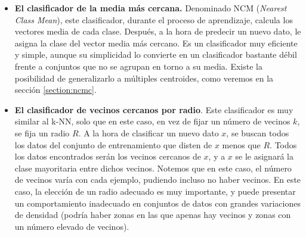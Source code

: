 \begin{itemize}
    \item \textbf{El clasificador de la media más cercana.} Denominado NCM (\emph{Nearest Class Mean}), este clasificador, durante el proceso de aprendizaje, calcula los vectores media de cada clase. Después, a la hora de predecir un nuevo dato, le asigna la clase del vector media más cercano. Es un clasificador muy eficiente y simple, aunque su simplicidad lo convierte en un clasificador bastante débil frente a conjuntos que no se agrupan en torno a su media. Existe la posibilidad de generalizarlo a múltiples centroides, como veremos en la sección \ref{section:ncmc}.

    \item \textbf{El clasificador de vecinos cercanos por radio}. Este clasificador es muy similar al k-NN, solo que en este caso, en vez de fijar un número de vecinos $k$, se fija un radio $R$. A la hora de clasificar un nuevo dato $x$, se buscan todos los datos del conjunto de entrenamiento que disten de $x$ menos que $R$. Todos los datos encontrados serán los vecinos cercanos de $x$, y a $x$ se le asignará la clase mayoritaria entre dichos vecinos. Notemos que en este caso, el número de vecinos varía con cada ejemplo, pudiendo incluso no haber vecinos. En este caso, la elección de un radio adecuado es muy importante, y puede presentar un comportamiento inadecuado en conjuntos de datos con grandes variaciones de densidad (podría haber zonas en las que apenas hay vecinos y zonas con un número elevado de vecinos).


\end{itemize}

